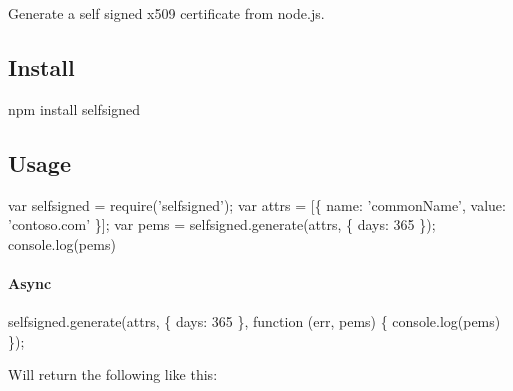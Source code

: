 Generate a self signed x509 certificate from node.\+js.

\href{https://travis-ci.org/jfromaniello/selfsigned}{\tt }

\subsection*{Install}


\begin{DoxyCode}
npm install selfsigned
\end{DoxyCode}


\subsection*{Usage}


\begin{DoxyCode}
var selfsigned = require('selfsigned');
var attrs = [\{ name: 'commonName', value: 'contoso.com' \}];
var pems = selfsigned.generate(attrs, \{ days: 365 \});
console.log(pems)
\end{DoxyCode}


\paragraph*{Async}


\begin{DoxyCode}
selfsigned.generate(attrs, \{ days: 365 \}, function (err, pems) \{
  console.log(pems)
\});
\end{DoxyCode}


Will return the following like this\+:


